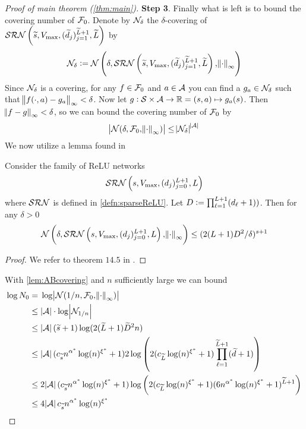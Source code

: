 \begin{proof}[Proof of main theorem (\ref{thm:main})]
  \textbf{Step 3}.
  Finally what is left is to bound the covering number of $\mathcal{F}_0$.
  Denote by $\mathcal{N}_\delta$ the $\delta$-covering of
  $\mathcal{SRN}\left( \widetilde{s}, V_{\max},
  (\widetilde{d}_j)_{j=1}^{\widetilde{L} + 1}, \widetilde{L} \right)$ by
  \[ \mathcal{N}_\delta \vcentcolon= \mathcal{N} \left( \delta,
      \mathcal{SRN}\left( \widetilde{s}, V_{\max},
  (\widetilde{d}_j)_{j=1}^{\widetilde{L} + 1}, \widetilde{L} \right),
  \norm{\cdot}_\infty \right) \]
  Since $\mathcal{N}_\delta$ is a covering, for any $f \in \mathcal{F}_0$
  and $a \in \mathcal{A}$ you can find a $g_a \in \mathcal{N}_\delta$ such that
  $\norm{f(\cdot, a) - g_a}_\infty < \delta$. Now let
  $g:\mathcal{S} \times \mathcal{A} \to \mathbb{R} = (s, a) \mapsto g_a(s)$.
  Then $\norm{f - g}_\infty < \delta$, so we can bound the covering number
  of $\mathcal{F}_0$ by
  \[ \abs{\mathcal{N}(\delta, \mathcal{F}_0,  \norm{\cdot}_\infty)}
  \leq \abs{\mathcal{N}_\delta}^{\abs{\mathcal{A}}} \]
  We now utilize a lemma found in 
  \begin{lem}
    Consider the family of ReLU networks
    \[ \mathcal{SRN}\left( s, V_{\max}, (d_j)_{j=0}^{L+1}, L \right) \]
    where $\mathcal{SRN}$ is defined in \cref{defn:sparseReLU}.
  Let $D \vcentcolon= \prod_{\ell=1}^{L+1} (d_\ell + 1))$. Then for any $\delta > 0$
  \[ \mathcal{N} \left(\delta,
      \mathcal{SRN}\left( s, V_{\max}, (d_j)_{j=0}^{L+1}, L \right),
  \norm{\cdot}_\infty \right) \leq (2 (L+1) D^2 / \delta)^{s + 1} \]
  \label{lem:ABcovering}
  \end{lem}
  \begin{proof}
    We refer to theorem $14.5$ in .
  \end{proof}
  With \cref{lem:ABcovering} and $n$ sufficiently large we can bound
  \begin{align*}
    \log N_0 = & \; \log \abs{\Cal{N}(1/n, \Cal{F}_0, \norm{\cdot}_\infty)}
    \\ \leq & \; \abs{\Cal{A}} \cdot \log \abs{\Cal{N}_{1/n}}
    \\ \leq & \; \abs{\Cal{A}} (\wt{s} + 1) \log (2 (\wt{L} + 1) \wt{D}^2 n)
    \\ \leq & \; \abs{\Cal{A}} (c_{\wt{s}} n^{\alpha^*} \log(n)^{\xi^*} + 1)
    2 \log \left(2 (c_{\wt{L}} \log(n)^{\xi^*} + 1) \prod_{\ell=1}^{\wt{L} + 1}
    (\wt{d} + 1) \right)
    \\ \leq & \; 2 \abs{\Cal{A}} (c_{\wt{s}} n^{\alpha^*} \log(n)^{\xi^*} + 1)
    \log \left(2 (c_{\wt{L}} \log(n)^{\xi^*} + 1)
    (6 n^{\alpha^*} \log(n)^{\xi^*} + 1)^{\wt{L} + 1} \right)
    \\ \leq & \; 4 \abs{\Cal{A}} c_{\wt{s}} n^{\alpha^*} \log(n)^{\xi^*}

\end{align*}
\end{proof}
